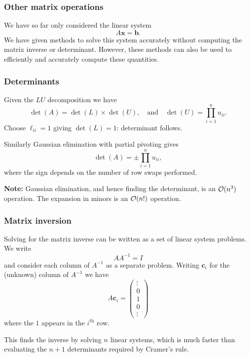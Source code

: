 \documentclass{beamer}
\newcommand{\bb}{{\boldsymbol{b}}}
\newcommand{\bx}{{\boldsymbol{x}}}
\newcommand{\bfm}[1]{{\boldsymbol{#1}}}
\begin{document}
\begin{frame}
  \frametitle{Other matrix operations}

  We have so far only considered the linear system
  \begin{equation*}
    A \bx = \bb.
  \end{equation*}
  We have given methods to solve this system accurately without
  computing the matrix inverse or determinant. However, these methods
  can also be used to efficiently and accurately compute these
  quantities.
\end{frame}

\begin{frame}
  \frametitle{Determinants}

  Given the $LU$ decomposition we have
  \begin{equation*}
    \det (A) = \det(L) \times \det(U), \quad \text{and} \quad \det(U)
    = \prod_{i=1}^n u_{ii}.
  \end{equation*}
  Choose $\ell_{ii}=1$ giving $\det(L) = 1$: determinant
  follows. \pause

  \vspace{1ex}

  Similarly Gaussian elimination with partial pivoting gives
  \begin{equation*}
    \det(A) = \pm \prod_{i=1}^n u_{ii},
  \end{equation*}
  where the sign depends on the number of row swaps performed.\pause

  \vspace{1ex}

  {\bf Note:} Gaussian elimination, and hence finding the determinant,
  is an ${\cal O}(n^3)$ operation.  The expansion in minors is an
  ${\cal O}(n!)$ operation.

\end{frame}

\begin{frame}
  \frametitle{Matrix inversion}

  Solving for the matrix inverse can be written as a set of linear
  system problems. We write
  \begin{equation*}
    A A^{-1} = I
  \end{equation*}
  and consider each column of $A^{-1}$ as a separate problem. \pause
  Writing $\bfm{c}_i$ for the (unknown) column of $A^{-1}$ we have
  \begin{equation*}
    A \bfm{c}_i =
    \begin{pmatrix}
       \vdots \\ 0 \\ 1 \\ 0 \\ \vdots
    \end{pmatrix}
  \end{equation*}
  where the $1$ appears in the $i^{\text{th}}$ row. \pause

  \vspace{1ex}

  This finds the inverse by solving $n$ linear systems, which is much
  faster than evaluating the $n+1$ determinants required by Cramer's
  rule.

\end{frame}
\end{document}
